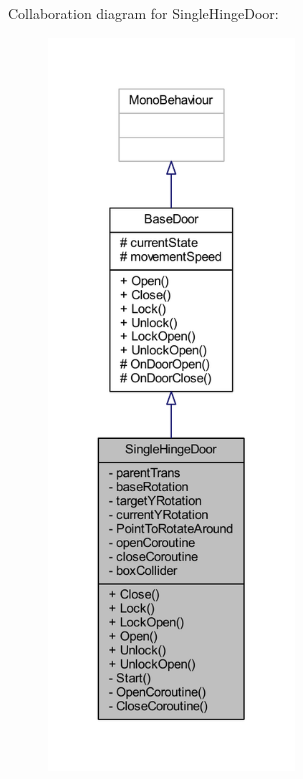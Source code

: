 Collaboration diagram for Single\+Hinge\+Door\+:\nopagebreak
\begin{figure}[H]
\begin{center}
\leavevmode
\includegraphics[height=550pt]{class_single_hinge_door__coll__graph}
\end{center}
\end{figure}
